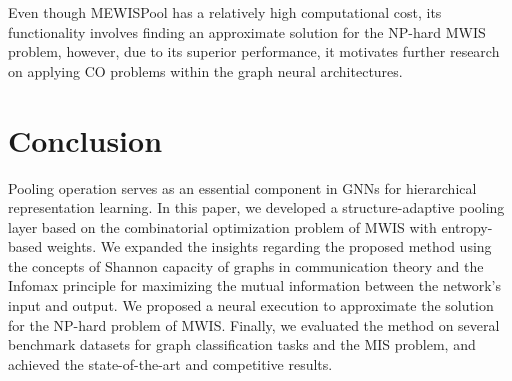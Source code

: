 \documentclass{article}
\begin{document}
Even though MEWISPool has a relatively high computational cost, its functionality involves finding an approximate solution for the NP-hard MWIS problem, however, due to its superior performance, it motivates further research on applying CO problems within the graph neural architectures.

\section{Conclusion}
\label{sec:conc}

Pooling operation serves as an essential component in GNNs for hierarchical representation learning. In this paper, we developed a structure-adaptive pooling layer based on the combinatorial optimization problem of MWIS with entropy-based weights. We expanded the insights regarding the proposed method using the concepts of Shannon capacity of graphs in communication theory and the Infomax principle for maximizing the mutual information between the network's input and output. We proposed a neural execution to approximate the solution for the NP-hard problem of MWIS. Finally, we evaluated the method on several benchmark datasets for graph classification tasks and the MIS problem, and achieved the state-of-the-art and competitive results.
\end{document}
